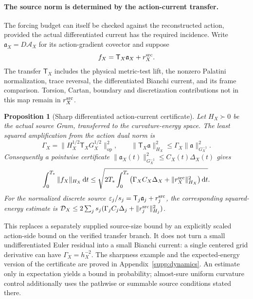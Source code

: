 \documentclass[11pt]{article}
\newtheorem{proposition}[proposition]{Proposition}
\theoremstyle{definition}
\theoremstyle{remark}
\newcommand{\dd}{\mathrm d}
\newcommand{\op}{\mathrm{op}}
\begin{document}
\paragraph{The source norm is determined by the action-current transfer.}
The forcing budget can itself be checked against the reconstructed action,
provided the actual differentiated current has the required incidence.  Write
$\mathfrak a_X=D\mathcal A_X$ for its action-gradient covector and suppose
\begin{equation}
 f_X=\mathsf T_X\mathfrak a_X+r_X^{\rm src}.
 \label{eq:main-current-incidence}
\end{equation}
The transfer $\mathsf T_X$ includes the physical metric-test lift, the nonzero
Palatini normalization, trace reversal, the differentiated Bianchi current,
and its frame comparison.  Torsion, Cartan, boundary and discretization
contributions not in this map remain in $r_X^{\rm src}$.

\begin{proposition}[Sharp differentiated action-current certificate]
\label{prop:main-action-current}
Let $H_X\succ0$ be the actual source Gram, transferred to the curvature-energy
space.  The least squared amplification from the action dual norm is
\begin{equation}
 \boxed{\Gamma_X
   =\|H_X^{1/2}\mathsf T_XG_X^{1/2}\|_{\op}^2,\qquad
 \|\mathsf T_X\mathfrak a\|_{H_X}^2
       \le\Gamma_X\|\mathfrak a\|_{G_X^{-1}}^2.}
 \label{eq:main-sharp-current-transfer}
\end{equation}
Consequently a pointwise certificate
$\|\mathfrak a_X(t)\|_{G_X^{-1}}^2\le C_X(t)\Delta_X(t)$ gives
\begin{equation}
 \int_0^{T_*}\|f_X\|_{H_X}\,\dd t
 \le\sqrt{2T_*\int_0^{T_*}
       \bigl(\Gamma_XC_X\Delta_X+
                         \|r_X^{\rm src}\|_{H_X}^2\bigr)\,\dd t}.
 \label{eq:main-action-source-budget}
\end{equation}
For the normalized discrete source
$\varepsilon_j/s_j=\mathsf T_j\mathfrak a_j+r_j^{\rm src}$, the
corresponding squared-energy estimate is
$\mathcal D_X\le2\sum_js_j(\Gamma_jC_j\Delta_j+
\|r_j^{\rm src}\|_{H_j}^2)$.
\end{proposition}

This replaces a separately supplied source-size bound by an explicitly scaled
action-side bound on the verified transfer branch.  It does not turn a small
undifferentiated Euler residual into a small Bianchi current: a single centered
grid derivative can have $\Gamma_X=h_X^{-2}$.  The sharpness example and the
expected-energy version of the certificate are proved in
Appendix~\ref{supp:dynamics}.  An estimate only in expectation yields a bound
in probability; almost-sure uniform curvature control additionally uses the
pathwise or summable source conditions stated there.
\end{document}
